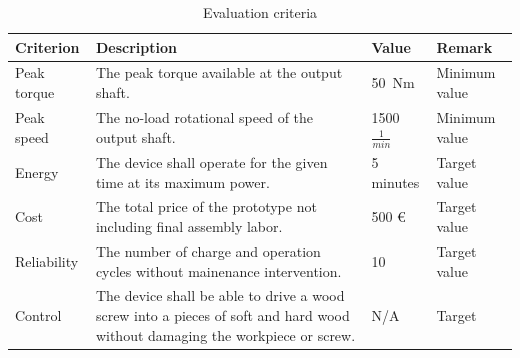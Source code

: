\documentclass[headinclude=true]{scrartcl}
\begin{document}
\begin{table}
\caption{Evaluation criteria}
\label{tab:evaluation}
 \begin{tabulary}{\linewidth}{lLll}
 \toprule
 Criterion & Description & Value & Remark \\ \midrule
 Peak torque & The peak torque available at the output shaft. & 50~Nm & Minimum value \\
 Peak speed & The no-load rotational speed of the output shaft. & 1500 $\frac{1}{min}$ & Minimum value \\
 Energy & The device shall operate for the given time at its maximum power. & 5 minutes & Target value \\
 Cost & The total price of the prototype not including final assembly labor. & 500 \euro & Target value \\
 Reliability & The number of charge and operation cycles without mainenance intervention. & 10 & Target value \\
 Control & The device shall be able to drive a wood screw into a pieces of soft and hard wood without damaging the workpiece or screw. & N/A & Target \\ \bottomrule
 
 
  
 \end{tabulary}
\end{table}








\printbibliography

\appendix
\end{document}
